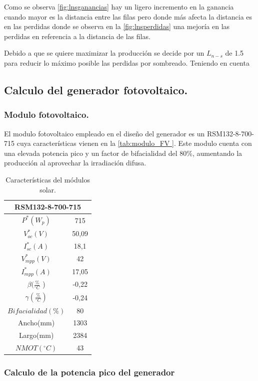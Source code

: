 \documentclass[12pt]{article}
\begin{document}
Como se observa \autoref{fig:lnsganancias} hay un ligero incremento en la ganancia cuando mayor es la distancia entre las filas pero donde más afecta la distancia es en las perdidas donde se observa en la \autoref{fig:lnsperdidas} una mejoría en las perdidas en referencia a la distancia de las filas.

Debido a que se quiere maximizar la producción se decide por un $L_{n-s}$ de 1.5 para reducir lo máximo posible las perdidas por sombreado.
Teniendo en cuenta

\subsection{Calculo del generador fotovoltaico. }

\subsubsection{Modulo fotovoltaico.}
El modulo fotovoltaico empleado en el diseño del generador es un RSM132-8-700-715 cuya características vienen en la \autoref{tab:modulo_FV }. Este modulo cuenta con una elevada potencia pico y un factor de bifacialidad del 80\%, aumentando la producción al aprovechar la irradiación difusa.
\begin{table}[h!]
	\centering
	\caption{Características del módulos solar.}
	\label{tab:modulo_FV }
\begin{tabular}{cc}
	\hline
	\multicolumn{2}{c}{RSM132-8-700-715} \\
	\hline
	$P^*  (W_p)$ & 715 \\
	\hline
	$V^*_{oc} (V)$ & 50,09 \\
	\hline
	$I^*_{sc}(A)$ & 18,1 \\
	\hline
	$V^*_{mpp}(V)$ & 42 \\
	\hline
	$I^*_{mpp}(A)$ & 17,05 \\
	\hline
	$\beta (\frac{\%}{^\circ{C}}$ )& -0,22 \\
	\hline
	$\gamma (\frac{\%}{^\circ{C}})$ & -0,24 \\
	\hline
	$Bifacialidad(\%)$&80\\
	\hline
	Ancho(mm)&1303\\
	\hline
	Largo(mm)&2384\\
	\hline
	$NMOT(^\circ C)$&43
	
\end{tabular}
\end{table}


\subsubsection{Calculo de la potencia pico del generador}
\end{document}
